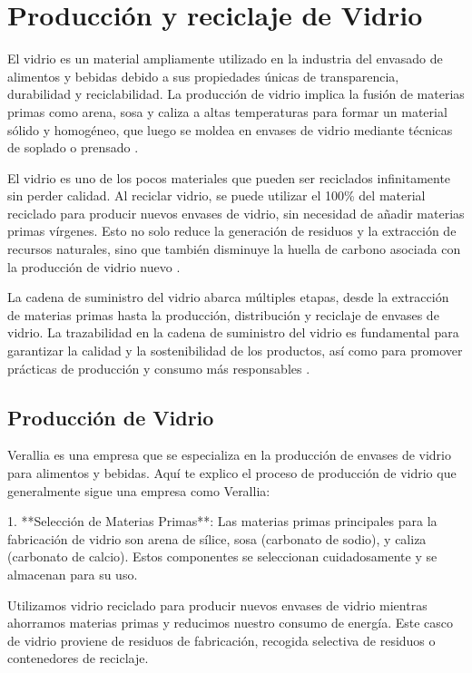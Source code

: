 \documentclass[main.tex]{subfiles}
\begin{document}
\section{Producción y reciclaje de Vidrio}

El vidrio es un material ampliamente utilizado en la industria del envasado de alimentos y bebidas debido a sus propiedades únicas de transparencia, durabilidad y reciclabilidad. La producción de vidrio implica la fusión de materias primas como arena, sosa y caliza a altas temperaturas para formar un material sólido y homogéneo, que luego se moldea en envases de vidrio mediante técnicas de soplado o prensado \cite{verallia2022vidrio}.

El vidrio es uno de los pocos materiales que pueden ser reciclados infinitamente sin perder calidad. Al reciclar vidrio, se puede utilizar el 100\% del material reciclado para producir nuevos envases de vidrio, sin necesidad de añadir materias primas vírgenes. Esto no solo reduce la generación de residuos y la extracción de recursos naturales, sino que también disminuye la huella de carbono asociada con la producción de vidrio nuevo \cite{verallia2022vidrio}.

La cadena de suministro del vidrio abarca múltiples etapas, desde la extracción de materias primas hasta la producción, distribución y reciclaje de envases de vidrio. La trazabilidad en la cadena de suministro del vidrio es fundamental para garantizar la calidad y la sostenibilidad de los productos, así como para promover prácticas de producción y consumo más responsables \cite{verallia2022vidrio}.

\subsection{Producción de Vidrio}

Verallia es una empresa que se especializa en la producción de envases de vidrio para alimentos y bebidas. Aquí te explico el proceso de producción de vidrio que generalmente sigue una empresa como Verallia:

1. **Selección de Materias Primas**: Las materias primas principales para la fabricación de vidrio son arena de sílice, sosa (carbonato de sodio), y caliza (carbonato de calcio). Estos componentes se seleccionan cuidadosamente y se almacenan para su uso.

Utilizamos vidrio reciclado para producir nuevos envases de vidrio mientras ahorramos materias primas y reducimos nuestro consumo de energía. Este casco de vidrio proviene de residuos de fabricación, recogida selectiva de residuos o contenedores de reciclaje. 
\end{document}
